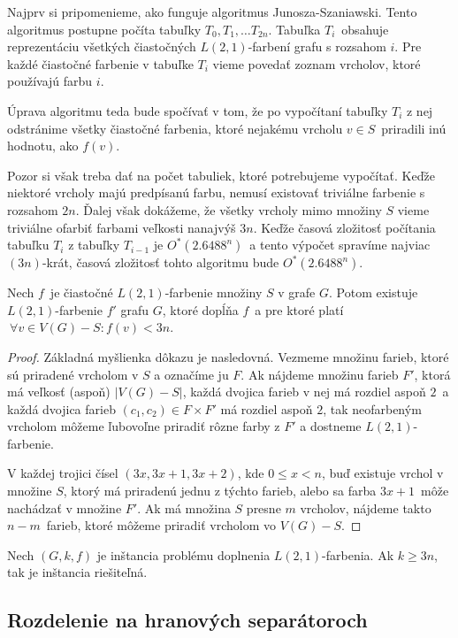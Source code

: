 Najprv si pripomenieme, ako funguje algoritmus Junosza-Szaniawski.
Tento algoritmus postupne počíta tabuľky $T_0, T_1, \ldots T_{2n}$.
Tabuľka $T_i$ obsahuje reprezentáciu všetkých čiastočných $L(2,1)$-farbení grafu s rozsahom $i$. Pre každé
čiastočné farbenie v tabuľke $T_i$ vieme povedať zoznam vrcholov, ktoré používajú farbu $i$.

Úprava algoritmu teda bude spočívať v tom, že po vypočítaní tabuľky $T_i$ z nej odstránime
všetky čiastočné farbenia, ktoré nejakému vrcholu $v \in S$ priradili inú hodnotu, ako $f(v)$.

Pozor si však treba dať na počet tabuliek, ktoré potrebujeme vypočítať. Keďže niektoré vrcholy
majú predpísanú farbu, nemusí existovať triviálne farbenie s rozsahom $2n$. Ďalej však dokážeme,
že všetky vrcholy mimo množiny $S$ vieme triviálne ofarbiť farbami veľkosti nanajvýš $3n$. Keďže
časová zložitosť počítania tabuľku $T_i$ z tabuľky $T_{i-1}$ je $O^*(2.6488^n)$ a tento výpočet
spravíme najviac $(3n)$-krát, časová zložitosť tohto algoritmu bude $O^*(2.6488^n)$.

\begin{lema}
    Nech $f$ je čiastočné $L(2,1)$-farbenie množiny $S$ v grafe $G$. Potom existuje
    $L(2,1)$-farbenie $f'$ grafu $G$, ktoré dopĺňa $f$ a pre ktoré platí $\ \forall v \in V(G) - S: f(v) < 3n$.
\end{lema}
\begin{proof}
    Základná myšlienka dôkazu je nasledovná. Vezmeme množinu farieb, ktoré sú priradené vrcholom v $S$
    a označíme ju $F$. Ak nájdeme množinu farieb $F'$, ktorá má veľkosť (aspoň) $|V(G) - S|$,
    každá dvojica farieb v nej má rozdiel aspoň $2$ a každá dvojica farieb $(c_1, c_2) \in F \times F'$ má
    rozdiel aspoň $2$, tak neofarbeným vrcholom môžeme ľubovoľne priradiť rôzne farby z $F'$ a dostneme
    $L(2,1)$-farbenie.

    V každej trojici čísel $(3x, 3x + 1, 3x+2)$, kde $0 \leq x < n$, buď existuje vrchol
    v množine $S$, ktorý má priradenú jednu z týchto farieb, alebo sa farba $3x + 1$ môže nachádzať v
    množine $F'$. Ak má množina $S$ presne $m$ vrcholov, nájdeme takto $n - m$ farieb, ktoré
    môžeme priradiť vrcholom vo $V(G) - S$.
\end{proof}
\begin{dosl}
    Nech $(G, k, f)$ je inštancia problému doplnenia $L(2,1)$-farbenia. Ak $k \ge 3n$, tak
    je inštancia riešiteľná.
\end{dosl}

\subsection{Rozdelenie na hranových separátoroch}

